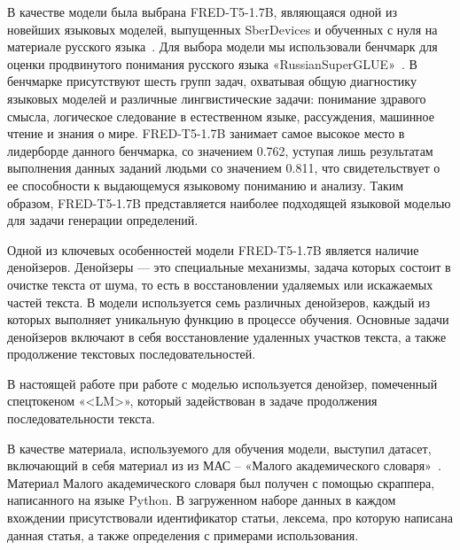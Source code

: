 \documentclass[LI,VKR]{HSEUniversity}
\begin{document}
В качестве модели была выбрана FRED-T5-1.7B, являющаяся одной из новейших языковых моделей,
выпущенных SberDevices и обученных с нуля на материале русского языка~\cite{FRED-T5}.
Для выбора модели мы использовали бенчмарк для оценки продвинутого понимания русского языка
«RussianSuperGLUE»~\cite{RussianSuperGLUE}.
В бенчмарке присутствуют шесть групп задач, охватывая
общую диагностику языковых моделей и различные лингвистические задачи:
понимание здравого смысла, логическое следование в естественном языке,
рассуждения, машинное чтение и знания о мире.
FRED-T5-1.7B занимает самое высокое место в лидерборде данного бенчмарка, со значением 0.762,
уступая лишь результатам выполнения данных заданий людьми со значением 0.811,
что свидетельствует о ее способности к выдающемуся языковому пониманию и анализу.
Таким образом, FRED-T5-1.7B представляется наиболее подходящей языковой моделью
для задачи генерации определений.

Одной из ключевых особенностей модели FRED-T5-1.7B является наличие денойзеров.
Денойзеры — это специальные механизмы, задача которых состоит в очистке текста от шума,
то есть в восстановлении удаляемых или искажаемых частей текста.
В модели используется семь различных денойзеров, каждый из которых выполняет
уникальную функцию в процессе обучения.
Основные задачи денойзеров включают в себя восстановление
удаленных участков текста, а также продолжение текстовых последовательностей.

В настоящей работе при работе с моделью используется денойзер,
помеченный спецтокеном «<LM>»,
который задействован в задаче продолжения последовательности текста.

В качестве материала, используемого для обучения модели, выступил датасет,
включающий в себя материал из из МАС – «Малого академического словаря»~\cite{MAS1981}.
Материал Малого академического словаря был получен с помощью скраппера, написанного на языке Python.
В загруженном наборе данных в каждом вхождении присутствовали
идентификатор статьи, лексема, про которую написана данная статья, а также определения
с примерами использования.
\end{document}
